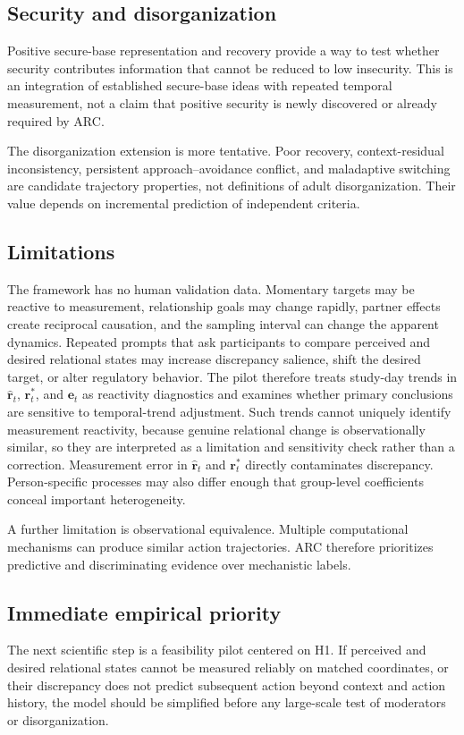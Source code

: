 \subsection{Security and disorganization}

Positive secure-base representation and recovery provide a way to test whether security contributes information that cannot be reduced to low insecurity. This is an integration of established secure-base ideas with repeated temporal measurement, not a claim that positive security is newly discovered or already required by ARC.

The disorganization extension is more tentative. Poor recovery, context-residual inconsistency, persistent approach--avoidance conflict, and maladaptive switching are candidate trajectory properties, not definitions of adult disorganization. Their value depends on incremental prediction of independent criteria.

\subsection{Limitations}

The framework has no human validation data. Momentary targets may be reactive to measurement, relationship goals may change rapidly, partner effects create reciprocal causation, and the sampling interval can change the apparent dynamics. Repeated prompts that ask participants to compare perceived and desired relational states may increase discrepancy salience, shift the desired target, or alter regulatory behavior. The pilot therefore treats study-day trends in \(\hat{\mathbf r}_t\), \(\mathbf r^\ast_t\), and \(\mathbf e_t\) as reactivity diagnostics and examines whether primary conclusions are sensitive to temporal-trend adjustment. Such trends cannot uniquely identify measurement reactivity, because genuine relational change is observationally similar, so they are interpreted as a limitation and sensitivity check rather than a correction. Measurement error in \(\hat{\mathbf r}_t\) and \(\mathbf r^\ast_t\) directly contaminates discrepancy. Person-specific processes may also differ enough that group-level coefficients conceal important heterogeneity.

A further limitation is observational equivalence. Multiple computational mechanisms can produce similar action trajectories. ARC therefore prioritizes predictive and discriminating evidence over mechanistic labels.

\subsection{Immediate empirical priority}

The next scientific step is a feasibility pilot centered on H1. If perceived and desired relational states cannot be measured reliably on matched coordinates, or their discrepancy does not predict subsequent action beyond context and action history, the model should be simplified before any large-scale test of moderators or disorganization.
